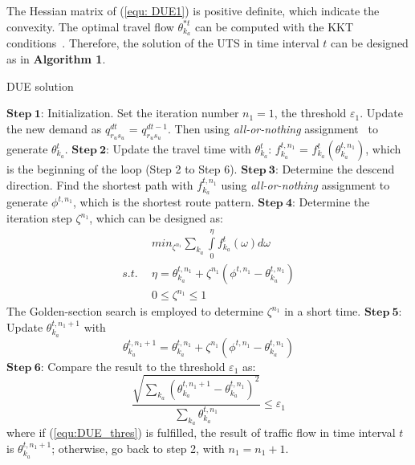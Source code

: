 \documentclass[final]{IEEEtran}
\begin{document}
The Hessian matrix of (\ref{equ: DUE1}) is positive definite, which indicate the convexity. The optimal travel flow $\theta^{*t}_{k_a}$ can be computed with the KKT conditions~\cite{boyd2004conv456ex, sheffy1985ur123ban}. Therefore, the solution of the UTS in time interval $t$ can be designed as in \textbf{Algorithm 1}.
\begin{algorithm}\label{algorithm1}
	\caption{DUE solution}
	\label{alg11}
	\begin{algorithmic}
		\STATE $\mathbf{Step\ 1}$: Initialization. Set the iteration number $n_{1} = 1$, the threshold $\varepsilon_{1}$. Update the new demand as $q^{dt}_{r_us_u}$ = $q^{dt-1}_{r_us_u}$. Then using \textit{all-or-nothing} assignment~\cite{sheffy1985ur123ban,chekuri200412all} to generate $\theta^t_{k_a}$.
		\STATE
		\STATE $\mathbf{Step\ 2}$: Update the travel time with $\theta^t_{k_a}$: $f^{t, n_{1}}_{k_a}$ = $f^{t}_{k_a}(\theta^{t, n_{1}}_{k_a})$, which is the beginning of the loop (Step 2 to Step 6).
		\STATE 
		\STATE $\mathbf{Step\ 3}$: Determine the descend direction. Find the shortest path with $f^{t, n_{1}}_{k_a}$ using \textit{all-or-nothing} assignment to generate $\phi^{t,n_{1}}$, which is the shortest route pattern.
		\STATE
		\STATE $\mathbf{Step\ 4}$: Determine the iteration step $\zeta^{n_1}$, which can be designed as:
		\begin{subequations}
			\begin{align}
			& min_{\zeta^{n_1}}\sum_{k_a}\int\limits_{0}^{\eta}f^{t}_{k_a}(\omega)d\omega \label{equ:step41} \\
			s.t. \ \ & \eta = \theta^{t, n_{1}}_{k_a} + \zeta^{n_1} (\phi^{t,n_{1}} - \theta^{t, n_{1}}_{k_a})  \label{equ:step42} \\
			& 0\leq \zeta^{n_1} \leq 1 \label{equ:step43}
			\end{align}
		\end{subequations}
	    The Golden-section search is employed to determine $\zeta^{n_1}$ in a short time.  
		\STATE
		\STATE $\mathbf{Step\ 5}$: Update $\theta^{t, n_{1}+1}_{k_a}$ with
		\begin{equation}
		\theta^{t, n_{1}+1}_{k_a} = \theta^{t, n_{1}}_{k_a} + \zeta^{n_1} (\phi^{t,n_{1}} - \theta^{t, n_{1}}_{k_a})
		\end{equation}
		\STATE
		\STATE $\mathbf{Step\ 6}$: Compare the result to the threshold $\varepsilon_{1}$ as:
		\begin{equation}
		\frac{\sqrt{\sum_{k_a}(\theta^{t, n_{1}+1}_{k_a} - \theta^{t, n_{1}}_{k_a})^2}}{\sum_{k_a}\theta^{t, n_{1}}_{k_a}} \leq \varepsilon_{1} \label{equ:DUE_thres}
		\end{equation}
		where if (\ref{equ:DUE_thres}) is fulfilled, the result of traffic flow in time interval $t$ is $\theta^{t, n_{1}+1}_{k_a}$; otherwise, go back to step 2, with $n_{1} = n_{1} + 1$.
	\end{algorithmic}
\end{algorithm}
\end{document}
